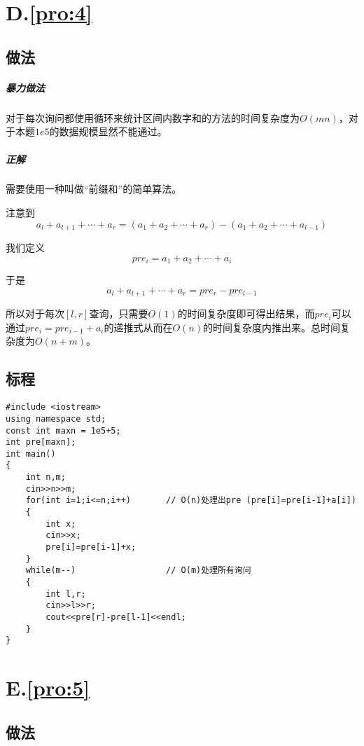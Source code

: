 \documentclass[
	lang=cn,
	color=blue
]{elegantbook}
\begin{document}
\chapter*{D.\quad \ref*{pro:4}}
\section*{做法}
\paragraph*{暴力做法} 对于每次询问都使用循环来统计区间内数字和的方法的时间复杂度为$O(mn)$，对于本题$1e5$的数据规模显然不能通过。

\paragraph*{正解} 需要使用一种叫做“前缀和”的简单算法。

注意到$$a_l+a_{l+1}+ \cdots + a_r = (a_1 + a_2 + \cdots + a_r) - (a_1 + a_2 + \cdots + a_{l-1})$$

我们定义$$pre_i = a_1 + a_2 + \cdots + a_i$$

于是$$a_l+a_{l+1}+ \cdots + a_r = pre_r - pre_{l-1}$$

所以对于每次$[l,r]$查询，只需要$O(1)$的时间复杂度即可得出结果，而$pre_i$可以通过$pre_i = pre_{i-1} + a_i$的递推式从而在$O(n)$的时间复杂度内推出来。总时间复杂度为$O(n+m)$。

\section*{标程}
\begin{lstlisting}
#include <iostream>
using namespace std;
const int maxn = 1e5+5;
int pre[maxn];
int main()
{
    int n,m;
    cin>>n>>m;
    for(int i=1;i<=n;i++)       // O(n)处理出pre (pre[i]=pre[i-1]+a[i])
    {
        int x;
        cin>>x;
        pre[i]=pre[i-1]+x;
    }
    while(m--)                  // O(m)处理所有询问
    {
        int l,r;
        cin>>l>>r;
        cout<<pre[r]-pre[l-1]<<endl;
    }
}
\end{lstlisting}

\chapter*{E.\quad \ref*{pro:5}}
\section*{做法}
\end{document}
